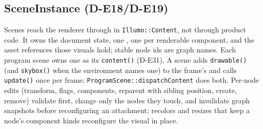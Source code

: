 \subsection{SceneInstance (D-E18/D-E19)}
Scenes reach the renderer through  in
\texttt{Illumo::Content}, not through product code. It owns the document
state, one , one  per renderable
component, and the asset references those visuals hold; stable node ids are
graph names. Each program scene owns one as its \texttt{content()} (D-E31). A
scene adds \texttt{drawable()} (and \texttt{skybox()} when the environment
names one) to the frame's  and calls \texttt{update()} once
per frame; \texttt{ProgramScene::dispatchContent} does both. Per-node edits (transform, flags, components, reparent with sibling
position, create, remove) validate first, change only the nodes they touch,
and invalidate graph snapshots before reconfiguring an attachment; recolors
and resizes that keep a node's component kinds reconfigure the visual in
place.
